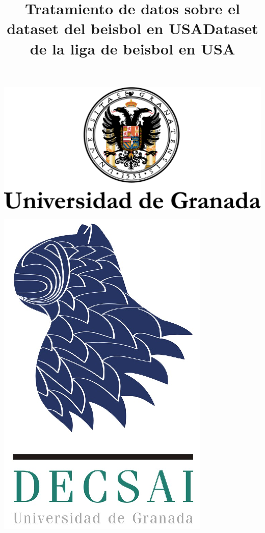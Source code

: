 \documentclass[10pt]{article}
\title{Tratamiento de datos sobre el dataset del beisbol en USA}
\title{Dataset de la liga de beisbol en USA}
\begin{document}
\begin{center}																		%
\newcommand{\HRule}{\rule{\linewidth}{0.5mm}}									%
\begin{minipage}{0.48\textwidth} \begin{flushleft}
\includegraphics[scale = 0.35]{Imagenes/logougr.eps}
\end{flushleft}\end{minipage}
\begin{minipage}{0.48\textwidth} \begin{flushright}
\includegraphics[scale = 0.63]{Imagenes/decsailogo.eps}
\end{flushright}\end{minipage}


\end{center}
\end{document}
